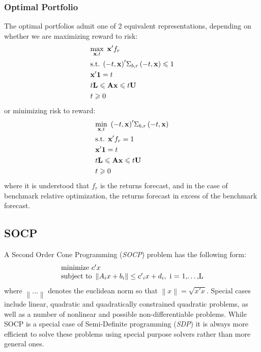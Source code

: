 \subsubsection{Optimal Portfolio}\label{qpopt}
The optimal portfolios admit one of 2 equivalent representations, depending on whether we are maximizing reward to risk:
\begin{equation}
\begin{gathered}
  \mathop {{\text{max}}}\limits_{{\mathbf{x}},t} {\text{ }}{\mathbf{x'}}{f_r} \hfill \\
  {\text{s.t.  }}{\left( { - t,{\mathbf{x}}} \right)^\prime }{\Sigma _{b,r}}\left( { - t,{\mathbf{x}}} \right) \leqslant 1 \hfill \\
  {\mathbf{x'1}} = t \hfill \\
  t{\mathbf{L}} \leqslant {\mathbf{Ax}} \leqslant t{\mathbf{U}} \hfill \\
  t \geqslant 0 \hfill \\ 
\end{gathered}
\end{equation}
or minimizing risk to reward:
\begin{equation}
\begin{gathered}
  \mathop {{\text{min}}}\limits_{{\mathbf{x}},t} {\text{ }}{\left( { - t,{\mathbf{x}}} \right)^\prime }{\Sigma _{b,r}}\left( { - t,{\mathbf{x}}} \right) \hfill \\
  {\text{s.t.  }}{\mathbf{x'}}{f_r} = 1 \hfill \\
  {\mathbf{x'1}} = t \hfill \\
  t{\mathbf{L}} \leqslant {\mathbf{Ax}} \leqslant t{\mathbf{U}} \hfill \\
  t \geqslant 0 \hfill \\ 
\end{gathered}
\end{equation}
where it is understood that $f_r$ is the returns forecast, and in the case of benchmark relative optimization, the returns forecast in excess of the benchmark forecast.
\subsection{SOCP}
A Second Order Cone Programming (\emph{SOCP}) problem has the following form:
\begin{equation}
\begin{array}{l}
{\text{minimize    }}c'x\\
{\text{subject to   }}\left\| {{A_i}x + {b_i}} \right\| \le {{c'}_i}x + {d_i},{\text{   i = 1,\dots,L}}\\
\end{array}
\end{equation}
where $\left\| {...} \right\|$ denotes the euclidean norm so that $\left\| x \right\| = \sqrt {x'x}$. Special cases include linear, quadratic and quadratically constrained quadratic problems, as well as a number of nonlinear and possible non-differentiable problems. While SOCP is a special case of Semi-Definite programming (\emph{SDP}) it is always more efficient to solve these problems using special purpose solvers rather than more general ones.
 
